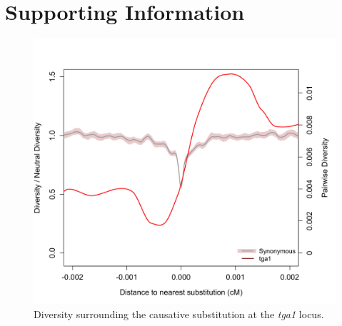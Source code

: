 \documentclass[12pt,a4paper]{article}
\begin{document}
\onecolumn
\section*{Supporting Information}
\renewcommand\thefigure{S\arabic{figure}}
\renewcommand\thetable{S\arabic{table}}    
\setcounter{figure}{0}
\setcounter{table}{0}


\begin{figure}[h]
  \begin{center}
    \includegraphics[width=\textwidth]{FigsAndFiles/plotDiversity_TvM_Folded2_Significance_tga1Supp_June.png}
    \end{center}
\caption{Diversity surrounding the causative substitution at the \emph{tga1} locus.  \label{sFig:tga1}}
\end{figure}
\clearpage
\end{document}
